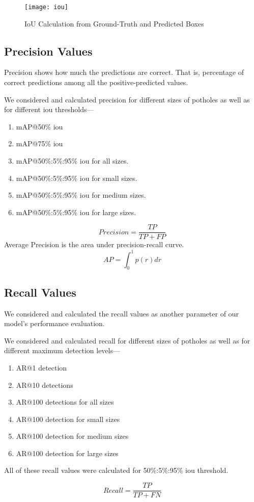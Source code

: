             \begin{figure}
                \centering
                \texttt{[image: iou]}
                \caption{IoU Calculation from Ground-Truth and Predicted Boxes}
                \label{fig:iou_calculation}
            \end{figure}

        \subsection{Precision Values}
            Precision shows how much the predictions are correct. That is, percentage of correct predictions among all the positive-predicted values.

            We considered and calculated precision for different  sizes of potholes as well as for different \acrshort{iou} thresholds---
            \begin{enumerate}
             \item mAP@50\% \acrshort{iou}
             \item mAP@75\% \acrshort{iou}
             \item mAP@50\%:5\%:95\% \acrshort{iou} for all sizes.
             \item mAP@50\%:5\%:95\% \acrshort{iou} for small sizes.
             \item mAP@50\%:5\%:95\% \acrshort{iou} for medium sizes.
             \item mAP@50\%:5\%:95\% \acrshort{iou} for large sizes.
            \end{enumerate}
            
            $$Precision = \frac{TP}{TP+FP}$$
            Average Precision is the area under precision-recall curve.
            $$AP = \int_{0}^{1}p(r) dr$$
        
        \subsection{Recall Values}
            We considered and calculated the recall values as another parameter of our model's performance evaluation.
            
            We considered and calculated recall for different  sizes of potholes as well as for different maximum detection levels---
            \begin{enumerate}
             \item AR@1 detection
             \item AR@10 detections
             \item AR@100 detections for all sizes
             \item AR@100 detection for small sizes
             \item AR@100 detection for medium sizes
             \item AR@100 detection for large sizes
            \end{enumerate}
            All of these recall values were calculated for 50\%:5\%:95\% \acrshort{iou} threshold.
            
            $$Recall = \frac{TP}{TP+FN}$$

                
    

    
